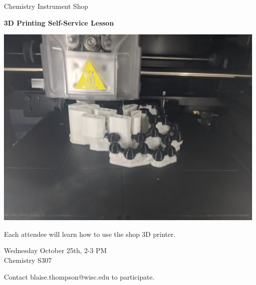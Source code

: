 \documentclass{article}
\begin{document}
\center

\Huge

Chemistry Instrument Shop

\textbf{
3D Printing
Self-Service Lesson
}

\includegraphics[width=\linewidth]{coverart.jpg}

{
\huge
Each attendee will learn how to use the shop 3D printer.
}

\vfill

{
\huge
Wednesday October 25th, 2-3 PM \\
Chemistry S307 \\
}

\vfill

{
\huge
Contact blaise.thompson@wisc.edu to participate.
}
\end{document}

